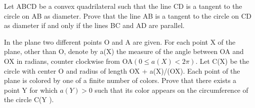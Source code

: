 \item Let ABCD be a convex quadrilateral such that the line CD is a tangent to the circle on AB as diameter. Prove that the line AB is a tangent to the circle on CD as diameter if and only if the lines BC and AD are parallel.

\item In the plane two different points O and A are given. For each point X of the plane, other than O, denote by a(X) the measure of the angle between OA and OX in radians, counter clockwise from OA$(0 \leq a(X) < 2\pi).$ Let C(X) be the circle with center O and radius of length OX + a(X)/(OX). Each point of the plane is colored by one of a finite number of colors. Prove that there exists a point Y for which $a(Y) > 0$ such that its color appears on the circumference of the circle C(Y ).




















